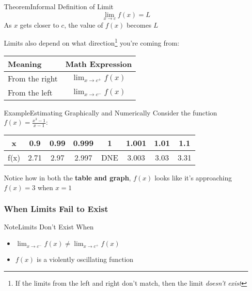\documentclass{MathNotes}
\newenvironment{example}[1]{\begin{BlueBox}{Example}{#1}}{\end{BlueBox}}
\newenvironment{note}[1]{\begin{YellowBox}{Note}{#1}}{\end{YellowBox}}
\newenvironment{theorem}[1]{\begin{GrayBox}{Theorem}{#1}}{\end{GrayBox}}
\begin{document}
\begin{multicols}{2}[]
	\begin{theorem}{Informal Definition of Limit}
		\[\lim_{x\to c}f(x)=L\]
		As $x$ gets closer to $c$, the value of $f(x)$ becomes $L$
	\end{theorem}


	Limits also depend on what direction\footnote{If the limits from the left and
		right don't match, then the limit \textit{doesn't exist}} you're coming from:
	\begin{tabular}{ |l|c| }
		\hline
		Meaning        & Math Expression       \\
		\hline
		\hline
		From the right & $\lim_{x\to c^+}f(x)$ \\
		\hline
		From the left  & $\lim_{x\to c^-}f(x)$ \\
		\hline
	\end{tabular}
\end{multicols}

\begin{example}{Estimating Graphically and Numerically}\label{ex:1.1}
	Consider the function $f(x)=\frac{x^3-1}{x-1}$:
	\begin{center}
		

		\begin{tabular}{ |c||c|c|c|c|c|c|c| }
			\hline
			x    & 0.9  & 0.99 & 0.999 & 1   & 1.001 & 1.01 & 1.1  \\
			\hline
			f(x) & 2.71 & 2.97 & 2.997 & DNE & 3.003 & 3.03 & 3.31 \\
			\hline
		\end{tabular}
	\end{center}

	Notice how in both the \textbf{table and graph}, $f(x)$ looks like it's
	approaching $f(x)=3$ when $x=1$
\end{example}

\subsubsection{When Limits Fail to Exist}
\begin{note}{Limits Don't Exist When}
	\begin{itemize}
		\item $\lim_{x\to c^-}f(x)\neq \lim_{x\to c^+}f(x)$
		\item $f(x)$ is a violently oscillating function
	\end{itemize}
\end{note}
\end{document}
